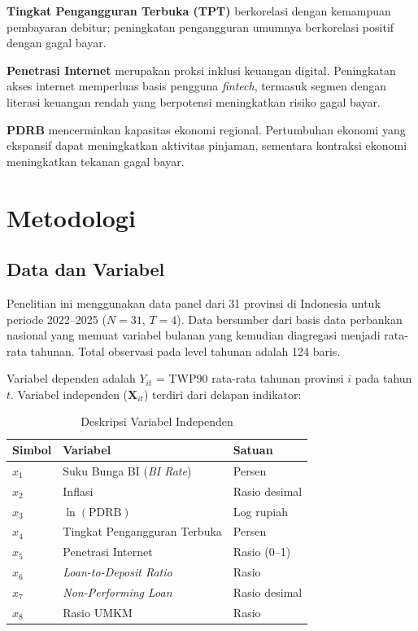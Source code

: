 \documentclass[12pt,a4paper]{article}
\begin{document}
\textbf{Tingkat Pengangguran Terbuka (TPT)} berkorelasi dengan kemampuan pembayaran debitur; peningkatan pengangguran umumnya berkorelasi positif dengan gagal bayar.

\textbf{Penetrasi Internet} merupakan proksi inklusi keuangan digital. Peningkatan akses internet memperluas basis pengguna \textit{fintech}, termasuk segmen dengan literasi keuangan rendah yang berpotensi meningkatkan risiko gagal bayar.

\textbf{PDRB} mencerminkan kapasitas ekonomi regional. Pertumbuhan ekonomi yang ekspansif dapat meningkatkan aktivitas pinjaman, sementara kontraksi ekonomi meningkatkan tekanan gagal bayar.

\section{Metodologi}

\subsection{Data dan Variabel}

Penelitian ini menggunakan data panel dari 31 provinsi di Indonesia untuk periode 2022--2025 ($N = 31$, $T = 4$). Data bersumber dari basis data perbankan nasional yang memuat variabel bulanan yang kemudian diagregasi menjadi rata-rata tahunan. Total observasi pada level tahunan adalah 124 baris.

Variabel dependen adalah $Y_{it}$ = TWP90 rata-rata tahunan provinsi $i$ pada tahun $t$. Variabel independen ($\mathbf{X}_{it}$) terdiri dari delapan indikator:

\begin{table}[H]
\centering
\caption{Deskripsi Variabel Independen}
\label{tab:variabel}
\begin{tabular}{lll}
\toprule
\textbf{Simbol} & \textbf{Variabel} & \textbf{Satuan} \\
\midrule
$x_1$ & Suku Bunga BI (\textit{BI Rate}) & Persen \\
$x_2$ & Inflasi & Rasio desimal \\
$x_3$ & $\ln(\text{PDRB})$ & Log rupiah \\
$x_4$ & Tingkat Pengangguran Terbuka & Persen \\
$x_5$ & Penetrasi Internet & Rasio (0--1) \\
$x_6$ & \textit{Loan-to-Deposit Ratio} & Rasio \\
$x_7$ & \textit{Non-Performing Loan} & Rasio desimal \\
$x_8$ & Rasio UMKM & Rasio \\
\bottomrule
\end{tabular}
\end{table}
\end{document}
